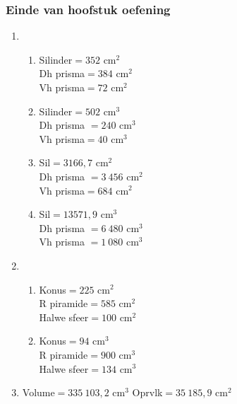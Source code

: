 {\begin{multicols}{3}
\subsubsection*{Einde van hoofstuk oefening} %
\begin{enumerate}[noitemsep, label=\textbf{\arabic*}. ] 
\item %
      \begin{enumerate}[noitemsep, label=\textbf{(\alph*)} ]
	  \item Silinder$ = 352$ cm$^2$\\  Dh prisma$= 384$ cm$^2$\\Vh prisma$ = 72$ cm$^2$%
	  \item Silinder$ = 502$ cm$^3$\\ Dh prisma $= 240$ cm$^3$\\Vh prisma$ = 40$ cm$^3$ %
\item Sil$=3166,7$ cm$^2$\\ Dh prisma $=3~456$ cm$^2$\\Vh prisma$=684$ cm$^2$%
\item Sil$=13571,9$ cm$^3$\\ Dh prisma $=6~480$ cm$^3$\\Vh prisma $=1~080$ cm$^3$ %
      \end{enumerate}
\item %
      \begin{enumerate}[noitemsep, label=\textbf{(\alph*)} ]
	  \item Konus$= 225$ cm$^2$\\R piramide$= 585$ cm$^2$\\Halwe sfeer$= 100$ cm$^2$%
	  \item Konus$ = 94$ cm$^3$\\R piramide$= 900$ cm$^3$ \\Halwe sfeer$= 134$ cm$^3$ %
      \end{enumerate}
\item Volume$=335~103,2$ cm$^3$ Oprvlk$=35~185,9$ cm$^2$%
\end{enumerate}
\end{multicols}

}
